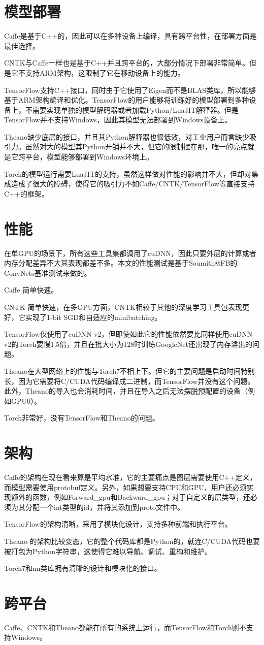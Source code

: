 \section{模型部署}
Caffe是基于C++的，因此可以在多种设备上编译，具有跨平台性，在部署方面是最佳选择。

CNTK与Caffe一样也是基于C++并且跨平台的，大部分情况下部署非常简单。但是它不支持ARM架构，这限制了它在移动设备上的能力。

TensorFlow支持C++接口，同时由于它使用了Eigen而不是BLAS类库，所以能够基于ARM架构编译和优化。TensorFlow的用户能够将训练好的模型部署到多种设备上，不需要实现单独的模型解码器或者加载Python/LuaJIT解释器。但是TensorFlow并不支持Windows，因此其模型无法部署到Windows设备上。

Theano缺少底层的接口，并且其Python解释器也很低效，对工业用户而言缺少吸引力。虽然对大的模型其Python开销并不大，但它的限制摆在那，唯一的亮点就是它跨平台，模型能够部署到Windows环境上。

Torch的模型运行需要LuaJIT的支持，虽然这样做对性能的影响并不大，但却对集成造成了很大的障碍，使得它的吸引力不如Caffe/CNTK/TensorFlow等直接支持C++的框架。

\section{性能}

在单GPU的场景下，所有这些工具集都调用了cuDNN，因此只要外层的计算或者内存分配差异不大其表现都差不多。本文的性能测试是基于Soumith@FB的ConvNets基准测试来做的。

Caffe 简单快速。

CNTK 简单快速，在多GPU方面，CNTK相较于其他的深度学习工具包表现更好，它实现了1-bit SGD和自适应的minibatching。

TensorFlow仅使用了cuDNN v2，但即使如此它的性能依然要比同样使用cuDNN v2的Torch要慢1.5倍，并且在批大小为128时训练GoogleNet还出现了内存溢出的问题。

Theano在大型网络上的性能与Torch7不相上下。但它的主要问题是启动时间特别长，因为它需要将C/CUDA代码编译成二进制，而TensorFlow并没有这个问题。此外，Theano的导入也会消耗时间，并且在导入之后无法摆脱预配置的设备（例如GPU0）。

Torch非常好，没有TensorFlow和Theano的问题。

\section{架构}
Caffe的架构在现在看来算是平均水准，它的主要痛点是图层需要使用C++定义，而模型需要使用protobuf定义。另外，如果想要支持CPU和GPU，用户还必须实现额外的函数，例如Forward\_gpu和Backward\_gpu；对于自定义的层类型，还必须为其分配一个int类型的id，并将其添加到proto文件中。

TensorFlow的架构清晰，采用了模块化设计，支持多种前端和执行平台。

Theano 的架构比较变态，它的整个代码库都是Python的，就连C/CUDA代码也要被打包为Python字符串，这使得它难以导航、调试、重构和维护。

Torch7和nn类库拥有清晰的设计和模块化的接口。

\section{跨平台}
Caffe、CNTK和Theano都能在所有的系统上运行，而TensorFlow和Torch则不支持Windows。
